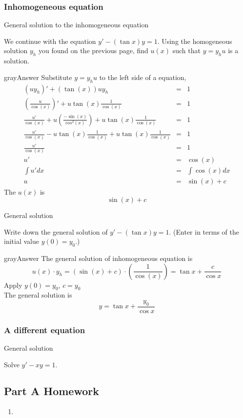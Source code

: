 \subsubsection{Inhomogeneous equation}
\begin{problem}
  General solution to the inhomogeneous equation
\end{problem}
We continue with the equation $y′− (\tan⁡ x)y = 1$.
Using the homogeneous solution $y_h$ you found on the previous page,
find $u(x)$ such that $y = y_h u$ is a solution.

\begin{mybox}{gray}{Answer}
  Substitute $y = y_h u$ to the left side of a equation,
  \begin{eqnarray*}
    (u y_h)' + (\tan(x)) uy_h &=& 1 \\
    \left( \frac{u}{\cos(x)} \right)' + u \tan(x) \frac{1}{\cos(x)} &=& 1 \\
    \frac{u'}{\cos(x)} + u\left( \frac{-\sin(x)}{cos^2 (x)} \right) + u \tan(x) \frac{1}{\cos(x)} &=& 1 \\
    \frac{u'}{\cos(x)} - u \tan(x) \frac{1}{\cos(x)} + u \tan(x) \frac{1}{\cos(x)} &=& 1 \\
    \frac{u'}{\cos(x)} &=& 1 \\
    u' &=& \cos(x) \\
    \int u' dx &=& \int \cos(x) dx \\
    u &=& \sin(x) + c
  \end{eqnarray*}
  The $u(x)$ is
  \begin{equation*}
    \sin (x) + c 
  \end{equation*}
\end{mybox}

\begin{problem}
  General solution
\end{problem}
Write down the general solution of $y′− (\tan⁡ x)y = 1$.
(Enter in terms of the initial value $y(0) = y_0$.)

\begin{mybox}{gray}{Answer}
  The general solution of inhomogeneous equation is
  \begin{equation*}
    u(x) \cdot y_h = \left( \sin (x) + c \right) \cdot (\frac{1}{\cos(x)}) = \tan x + \frac{c}{\cos x}
  \end{equation*}
  Apply $y(0) = y_0$, $c = y_0$ \\

  The general solution is
  \begin{equation*}
    y = \tan x + \frac{y_0}{\cos x}
  \end{equation*}
\end{mybox}
\clearpage
\subsubsection{A different equation}
\begin{problem}
  General solution
\end{problem}
Solve $y' -xy = 1.$ 

\clearpage

\subsection{Part A Homework}
\begin{enumerate}
\item 
\end{enumerate}



